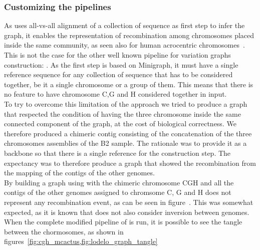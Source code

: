 \subsubsection{Customizing the pipelines}
As \pggb uses all-vs-all alignment of a collection of sequence as first step to infer the graph, it enables the representation of recombination among chromosomes placed inside the same community, as seen also for human acrocentric chromosomes~\cite{Guarracino2023}.\\
This is not the case for the other well known pipeline for variation graphs construction: \mcactus. As the first step is based on Minigraph, it must have a single reference sequence for any collection of sequence that has to be considered together, be it a single chromosome or a group of them.
This means that there is no feature to have chromosome C,G and H considered together in input. \\
To try to overcome this limitation of the approach we tried to produce a graph that respected the condition of having the three chromosome inside the same connected component of the graph, at the cost of biological correctness. We therefore produced a chimeric contig consisting of the concatenation of the three chromosomes assemblies of the B2 sample. The rationale was to provide it as a backbone so that there is a single reference for the \minigraph construction step. The expectancy was to therefore produce a graph that showed the recombination from the mapping of the contigs of the other genomes. \\
By building a graph using \minigraph with the chimeric chromosome CGH and all the contigs of the other genomes assigned to chromsome C, G and H does not represent any recombination event, as can be seen in figure~\cite{fig:cgh_mingraph}. This was somewhat expected, as it is known that \minigraph does not also consider inversion between genomes.
When the complete modified pipeline of \mcactus is run, it is possible to see the tangle between the chormosomes, as shown in figures~\ref{fig:cgh_mcactus,fig:lodelo_graph_tangle}
